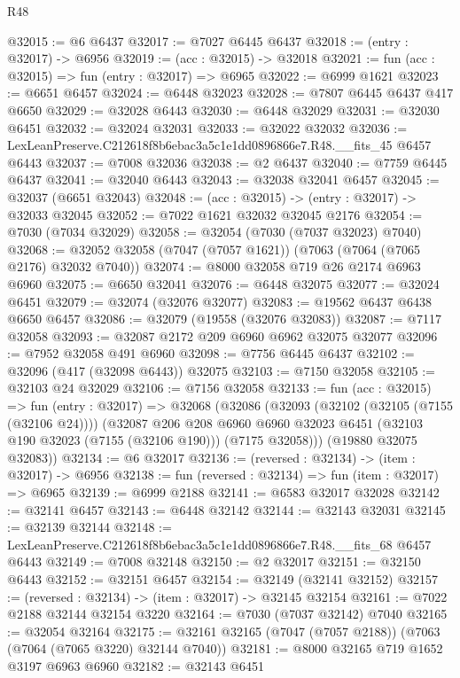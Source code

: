 \begin{lexlean}{R48}
\begin{coremodule}
@32015 := @6 @6437
@32017 := @7027 @6445 @6437
@32018 := (entry : @32017) -> @6956
@32019 := (acc : @32015) -> @32018
@32021 := fun (acc : @32015) => fun (entry : @32017) => @6965
@32022 := @6999 @1621
@32023 := @6651 @6457
@32024 := @6448 @32023
@32028 := @7807 @6445 @6437 @417 @6650
@32029 := @32028 @6443
@32030 := @6448 @32029
@32031 := @32030 @6451
@32032 := @32024 @32031
@32033 := @32022 @32032
@32036 := LexLeanPreserve.C212618f8b6ebac3a5c1e1dd0896866e7.R48.__fits_45 @6457 @6443
@32037 := @7008 @32036
@32038 := @2 @6437
@32040 := @7759 @6445 @6437
@32041 := @32040 @6443
@32043 := @32038 @32041 @6457
@32045 := @32037 (@6651 @32043)
@32048 := (acc : @32015) -> (entry : @32017) -> @32033 @32045
@32052 := @7022 @1621 @32032 @32045 @2176
@32054 := @7030 (@7034 @32029)
@32058 := @32054 (@7030 (@7037 @32023) @7040)
@32068 := @32052 @32058 (@7047 (@7057 @1621)) (@7063 (@7064 (@7065 @2176) @32032 @7040))
@32074 := @8000 @32058 @719 @26 @2174 @6963 @6960
@32075 := @6650 @32041
@32076 := @6448 @32075
@32077 := @32024 @6451
@32079 := @32074 (@32076 @32077)
@32083 := @19562 @6437 @6438 @6650 @6457
@32086 := @32079 (@19558 (@32076 @32083))
@32087 := @7117 @32058
@32093 := @32087 @2172 @209 @6960 @6962 @32075 @32077
@32096 := @7952 @32058 @491 @6960
@32098 := @7756 @6445 @6437
@32102 := @32096 (@417 (@32098 @6443)) @32075
@32103 := @7150 @32058
@32105 := @32103 @24 @32029
@32106 := @7156 @32058
@32133 := fun (acc : @32015) =>
  fun (entry : @32017) =>
  @32068
    (@32086
      (@32093
        (@32102 (@32105 (@7155 (@32106 @24))))
        (@32087
          @206
          @208
          @6960
          @6960
          @32023
          @6451
          (@32103 @190 @32023 (@7155 (@32106 @190)))
          (@7175 @32058)))
      (@19880 @32075 @32083))
@32134 := @6 @32017
@32136 := (reversed : @32134) -> (item : @32017) -> @6956
@32138 := fun (reversed : @32134) => fun (item : @32017) => @6965
@32139 := @6999 @2188
@32141 := @6583 @32017 @32028
@32142 := @32141 @6457
@32143 := @6448 @32142
@32144 := @32143 @32031
@32145 := @32139 @32144
@32148 := LexLeanPreserve.C212618f8b6ebac3a5c1e1dd0896866e7.R48.__fits_68 @6457 @6443
@32149 := @7008 @32148
@32150 := @2 @32017
@32151 := @32150 @6443
@32152 := @32151 @6457
@32154 := @32149 (@32141 @32152)
@32157 := (reversed : @32134) -> (item : @32017) -> @32145 @32154
@32161 := @7022 @2188 @32144 @32154 @3220
@32164 := @7030 (@7037 @32142) @7040
@32165 := @32054 @32164
@32175 := @32161 @32165 (@7047 (@7057 @2188)) (@7063 (@7064 (@7065 @3220) @32144 @7040))
@32181 := @8000 @32165 @719 @1652 @3197 @6963 @6960
@32182 := @32143 @6451

\end{coremodule}
\end{lexlean}
